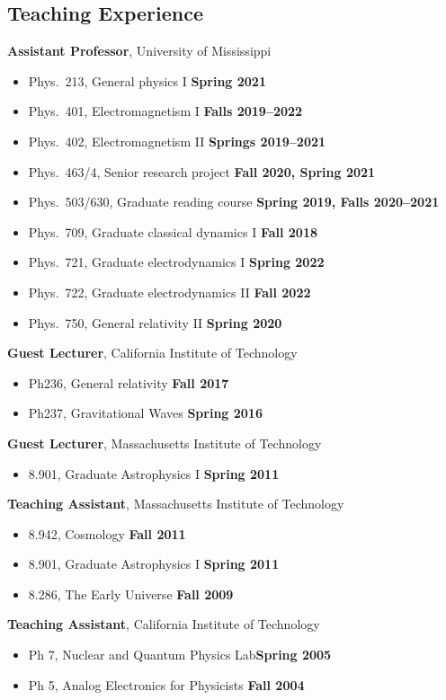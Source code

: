 \documentclass[margin,line]{res}
\begin{document}
\begin{resume}
\vspace{-1em}

\section{\sc Teaching Experience}
{\bf Assistant Professor}, University of Mississippi
\vspace*{.05in}
\begin{itemize}
\item[ ] Phys.~213, General physics I \hfill {\bf Spring 2021}
\item[ ] Phys.~401, Electromagnetism I \hfill {\bf Falls 2019--2022}
\item[ ] Phys.~402, Electromagnetism II \hfill {\bf Springs 2019--2021}
\item[ ] Phys.~463/4, Senior research project \hfill {\bf Fall 2020,
    Spring 2021}
\item[ ] Phys.~503/630, Graduate reading course \hfill {\bf Spring 2019, Falls 2020--2021}
\item[ ] Phys.~709, Graduate classical dynamics I \hfill {\bf Fall 2018}
\item[ ] Phys.~721, Graduate electrodynamics I \hfill {\bf Spring 2022}
\item[ ] Phys.~722, Graduate electrodynamics II \hfill {\bf Fall 2022}
\item[ ] Phys.~750, General relativity II \hfill {\bf Spring 2020}
\end{itemize}
{\bf Guest Lecturer}, California Institute of Technology
\vspace*{.05in}
\begin{itemize}
\item[ ] Ph236, General relativity \hfill {\bf Fall 2017}
\item[ ] Ph237, Gravitational Waves \hfill {\bf Spring 2016}
\end{itemize}
{\bf Guest Lecturer}, Massachusetts Institute of Technology
\vspace*{.05in}  
\begin{itemize}
\item[ ] 8.901, Graduate Astrophysics I \hfill {\bf Spring 2011}
\end{itemize}
{\bf Teaching Assistant}, Massachusetts Institute of Technology
\vspace*{.05in}
\begin{itemize}
\item[ ] 8.942, Cosmology \hfill {\bf Fall 2011}
\item[ ] 8.901, Graduate Astrophysics I \hfill {\bf Spring 2011}
\item[ ] 8.286, The Early Universe \hfill {\bf Fall 2009}
\end{itemize}
{\bf Teaching Assistant}, California Institute of Technology
\vspace*{.05in}
\begin{itemize}
\item[ ] Ph 7, Nuclear and Quantum Physics Lab\hfill {\bf Spring 2005}
\item[ ] Ph 5, Analog Electronics for Physicists \hfill {\bf Fall 2004}
\end{itemize}


\end{resume}
\end{document}
